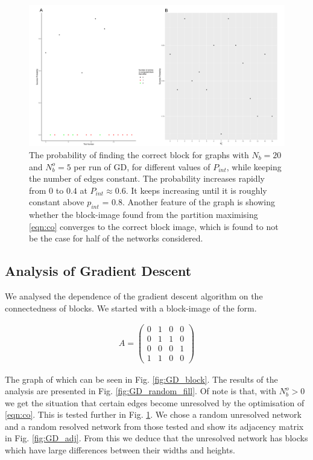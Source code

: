 \documentclass[9pt,twocolumn,twoside,lineno]{pnas-new}
\begin{document}
\begin{figure}%
\centering
\includegraphics[width=.9\linewidth]{figures/NB_VAR}
\caption{The probability of finding the correct block for graphs with $N_b = 20$ and $N_b^o = 5$ per run of GD, for different values of $P_{int}$, while keeping the number of edges constant. The probability increases rapidly from $0$ to $0.4$ at $P_{int} \approx 0.6$. It keeps increasing until it is roughly constant above $p_{int}$ = 0.8. Another feature of the graph is showing whether the block-image found from the partition maximising \ref{eqn:co} converges to the correct block image, which is found to not be the case for half of the networks considered. }
\label{fig:GD_resolving}
\end{figure}

\subsection*{Analysis of Gradient Descent}
We analysed the dependence of the gradient descent algorithm on the connectedness of blocks. We started with a block-image of the form. 

\begin{align*}
    A = 
    \begin{pmatrix} 
        0 & 1 & 0 & 0 \\
        0 & 1 & 1 & 0 \\
        0 & 0 & 0 & 1 \\
        1 & 1 & 0 & 0 
    \end{pmatrix} 
\end{align*}

The graph of which can be seen in Fig. \ref{fig:GD_block}. The results of the analysis are presented in Fig. \ref{fig:GD_random_fill}. Of note is that, with $N_b^o > 0$ we get the situation that certain edges become unresolved by the optimisation of \ref{eqn:co}. This is tested further in Fig. \ref{fig:GD_resolving}. We chose a random unresolved network and a random resolved network from those tested and show its adjacency matrix in Fig. \ref{fig:GD_adj}. From this we deduce that the unresolved network has blocks which have large differences between their widths and heights. 
\end{document}
